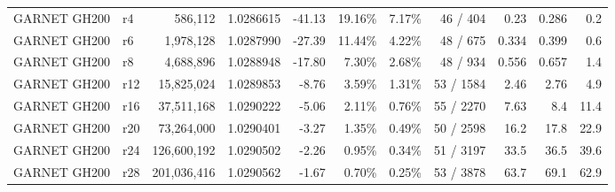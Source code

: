 \begin{tabular}{llrrrrrrrrr}
GARNET GH200 & r4 & 586,112 & 1.0286615 & -41.13 & 19.16\% & 7.17\% & 46 / 404 & 0.23 & 0.286 & 0.2 \\
GARNET GH200 & r6 & 1,978,128 & 1.0287990 & -27.39 & 11.44\% & 4.22\% & 48 / 675 & 0.334 & 0.399 & 0.6 \\
GARNET GH200 & r8 & 4,688,896 & 1.0288948 & -17.80 & 7.30\% & 2.68\% & 48 / 934 & 0.556 & 0.657 & 1.4 \\
GARNET GH200 & r12 & 15,825,024 & 1.0289853 & -8.76 & 3.59\% & 1.31\% & 53 / 1584 & 2.46 & 2.76 & 4.9 \\
GARNET GH200 & r16 & 37,511,168 & 1.0290222 & -5.06 & 2.11\% & 0.76\% & 55 / 2270 & 7.63 & 8.4 & 11.4 \\
GARNET GH200 & r20 & 73,264,000 & 1.0290401 & -3.27 & 1.35\% & 0.49\% & 50 / 2598 & 16.2 & 17.8 & 22.9 \\
GARNET GH200 & r24 & 126,600,192 & 1.0290502 & -2.26 & 0.95\% & 0.34\% & 51 / 3197 & 33.5 & 36.5 & 39.6 \\
GARNET GH200 & r28 & 201,036,416 & 1.0290562 & -1.67 & 0.70\% & 0.25\% & 53 / 3878 & 63.7 & 69.1 & 62.9 \\
\hline
\end{tabular}
